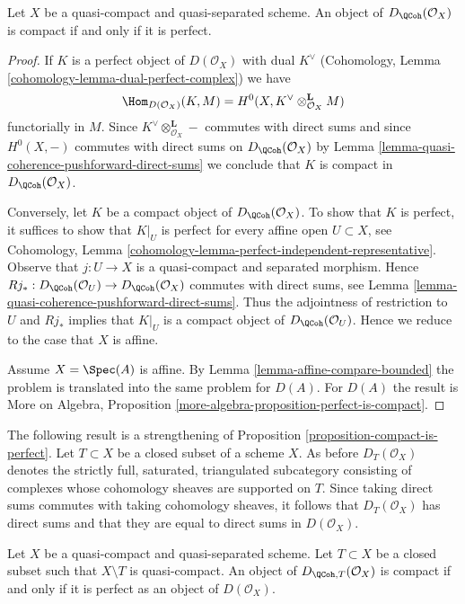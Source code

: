 \begin{proposition}
\label{proposition-compact-is-perfect}
Let $X$ be a quasi-compact and quasi-separated scheme.
An object of $D_\QCoh(\mathcal{O}_X)$ is compact
if and only if it is perfect.
\end{proposition}

\begin{proof}
If $K$ is a perfect object of $D(\mathcal{O}_X)$ with dual
$K^\vee$ (Cohomology, Lemma \ref{cohomology-lemma-dual-perfect-complex})
we have
$$
\Hom_{D(\mathcal{O}_X)}(K, M) =
H^0(X, K^\vee \otimes_{\mathcal{O}_X}^\mathbf{L} M)
$$
functorially in $M$. Since $K^\vee \otimes_{\mathcal{O}_X}^\mathbf{L} -$
commutes with direct sums and since $H^0(X, -)$ commutes with direct
sums on $D_\QCoh(\mathcal{O}_X)$ by
Lemma \ref{lemma-quasi-coherence-pushforward-direct-sums}
we conclude that $K$ is compact in $D_\QCoh(\mathcal{O}_X)$.

\medskip\noindent
Conversely, let $K$ be a compact object of $D_\QCoh(\mathcal{O}_X)$.
To show that $K$ is perfect, it suffices to show that
$K|_U$ is perfect for every affine open $U \subset X$, see
Cohomology, Lemma \ref{cohomology-lemma-perfect-independent-representative}.
Observe that $j : U \to X$ is a quasi-compact and separated morphism.
Hence
$Rj_* : D_\QCoh(\mathcal{O}_U) \to D_\QCoh(\mathcal{O}_X)$
commutes with direct sums, see
Lemma \ref{lemma-quasi-coherence-pushforward-direct-sums}.
Thus the adjointness of restriction to $U$ and $Rj_*$ implies that
$K|_U$ is a compact object of $D_\QCoh(\mathcal{O}_U)$.
Hence we reduce to the case that $X$ is affine.

\medskip\noindent
Assume $X = \Spec(A)$ is affine. By Lemma \ref{lemma-affine-compare-bounded}
the problem is translated into the same problem for $D(A)$.
For $D(A)$ the result is
More on Algebra, Proposition \ref{more-algebra-proposition-perfect-is-compact}.
\end{proof}

\noindent
The following result is a strengthening of
Proposition \ref{proposition-compact-is-perfect}.
Let $T \subset X$ be a closed subset of a scheme $X$. As before
$D_T(\mathcal{O}_X)$ denotes the strictly full, saturated,
triangulated subcategory consisting of complexes whose
cohomology sheaves are supported on $T$. Since taking direct
sums commutes with taking cohomology sheaves, it follows
that $D_T(\mathcal{O}_X)$ has direct sums and that they are equal
to direct sums in $D(\mathcal{O}_X)$.

\begin{lemma}
\label{lemma-compact-is-perfect-with-support}
Let $X$ be a quasi-compact and quasi-separated scheme.
Let $T \subset X$ be a closed subset such that $X \setminus T$
is quasi-compact. An object of $D_{\QCoh, T}(\mathcal{O}_X)$ is compact
if and only if it is perfect as an object of $D(\mathcal{O}_X)$.
\end{lemma}

